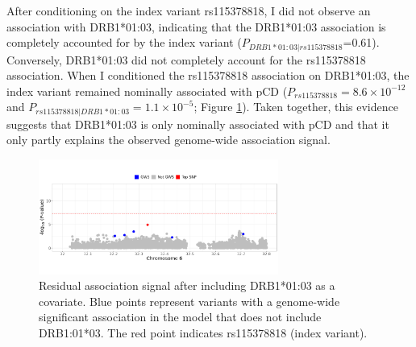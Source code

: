 After conditioning on the index variant rs115378818, I did not observe an association with DRB1*01:03, indicating that the  DRB1*01:03 association is completely accounted for by the index variant ($P_{DRB1*01:03|rs115378818}$=0.61). Conversely, DRB1*01:03 did not completely account for the rs115378818 association. When I conditioned the rs115378818 association on DRB1*01:03, the index variant remained nominally associated with pCD ($P_{rs115378818}=8.6\times10^{-12}$ and  $P_{rs115378818|DRB1*01:03}=1.1\times10^{-5}$; Figure \ref{fig:residual_assoc_plot}). Taken together, this evidence suggests that  DRB1*01:03 is only nominally associated with pCD and that it only partly explains the observed genome-wide association signal. 

 
\begin{figure}[H] 
  \centering    
  \includegraphics[width=0.7\textwidth]{Vector/cond_regional_assoc_plot}
  \caption[Regional association plot of 6p21.32 conditional on HLA-DRB1*01:03]{Residual association signal after including DRB1*01:03 as a covariate. Blue points represent variants with a genome-wide significant association in the model that does not include DRB1:01*03. The red point indicates rs115378818 (index variant).}
  \label{fig:residual_assoc_plot}
  \end{figure}

  
